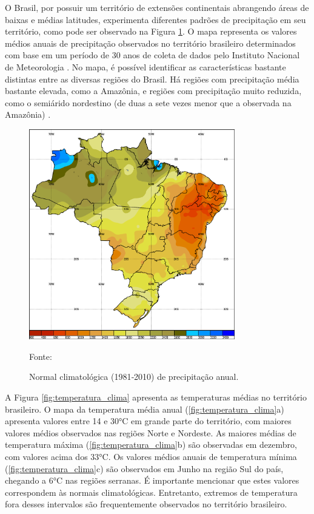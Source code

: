 O Brasil, por possuir um território de extensões continentais abrangendo áreas de baixas e médias latitudes, experimenta diferentes padrões de precipitação em seu território, como pode ser observado na Figura \ref{fig:chuvas_clima}. O mapa representa os valores médios anuais de precipitação observados no território brasileiro determinados com base em um período de 30 anos de coleta de dados pelo Instituto Nacional de Meteorologia \cite{INMET}. No mapa, é possível identificar as características bastante distintas entre as diversas regiões do Brasil. Há regiões com precipitação média bastante elevada, como a Amazônia, e regiões com precipitação muito reduzida, como o semiárido nordestino (de duas a sete vezes menor que a observada na Amazônia) \cite{atlas2017}.

\begin{figure}[H]
    \centering
    \includegraphics[width=0.8\textwidth]{./Figuras/chuvas_clima.png}
    \caption{Normal climatológica (1981‐2010)  de precipitação anual.}{Fonte: \cite{INMET}}
   \label{fig:chuvas_clima}
\end{figure}

A Figura \ref{fig:temperatura_clima} apresenta as temperaturas médias no território brasileiro. O mapa da temperatura média anual (\ref{fig:temperatura_clima}a) apresenta valores entre 14 e 30°C em grande parte do território, com maiores valores médios observados nas regiões Norte e Nordeste. As maiores médias de temperatura máxima (\ref{fig:temperatura_clima}b) são observadas em dezembro, com valores acima dos 33°C. Os valores médios anuais de temperatura mínima (\ref{fig:temperatura_clima}c) são observados em Junho na região Sul do país, chegando a 6°C nas regiões serranas. É importante mencionar que estes valores correspondem às normais climatológicas. Entretanto, extremos de temperatura fora desses intervalos são frequentemente observados no território brasileiro.

